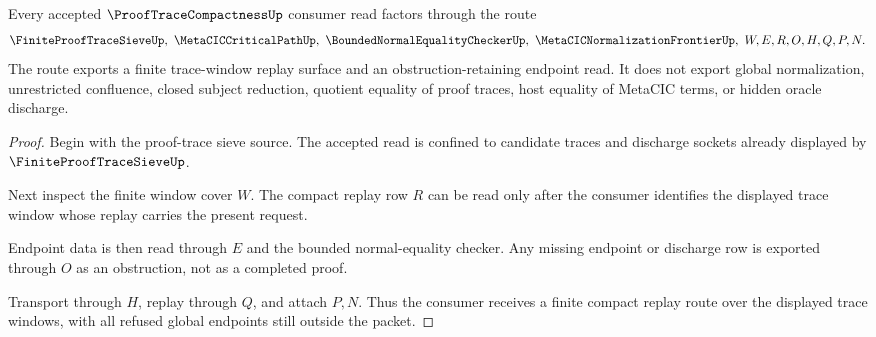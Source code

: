 \begin{theorem}
\label{thm:proof-trace-compactness-replay-route}
Every accepted $\ProofTraceCompactnessUp$ consumer read factors through the route
$$
\FiniteProofTraceSieveUp,\ \MetaCICCriticalPathUp,\ \BoundedNormalEqualityCheckerUp,\ \MetaCICNormalizationFrontierUp,\ W,E,R,O,H,Q,P,N.
$$
The route exports a finite trace-window replay surface and an obstruction-retaining endpoint read. It does not export global normalization, unrestricted confluence, closed subject reduction, quotient equality of proof traces, host equality of MetaCIC terms, or hidden oracle discharge.
\end{theorem}
\begin{proof}
Begin with the proof-trace sieve source. The accepted read is confined to candidate traces and discharge sockets already displayed by $\FiniteProofTraceSieveUp$.

Next inspect the finite window cover $W$. The compact replay row $R$ can be read only after the consumer identifies the displayed trace window whose replay carries the present request.

Endpoint data is then read through $E$ and the bounded normal-equality checker. Any missing endpoint or discharge row is exported through $O$ as an obstruction, not as a completed proof.

Transport through $H$, replay through $Q$, and attach $P,N$. Thus the consumer receives a finite compact replay route over the displayed trace windows, with all refused global endpoints still outside the packet.
\end{proof}



